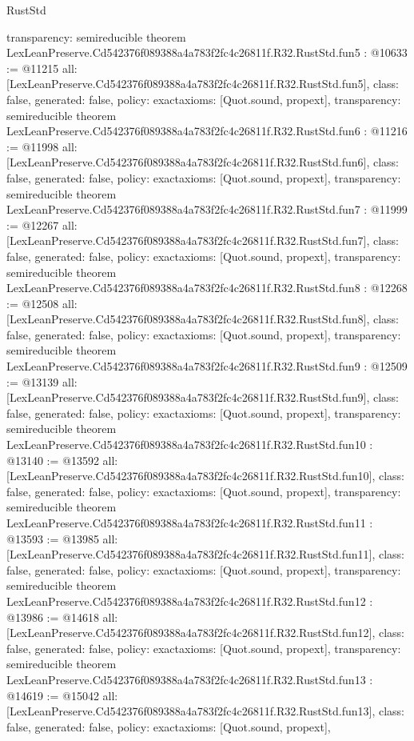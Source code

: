 \begin{lexlean}{RustStd}
\begin{coremodule}
{  transparency: semireducible
}
theorem LexLeanPreserve.Cd542376f089388a4a783f2fc4c26811f.R32.RustStd.fun5 : @10633 := @11215 {
  all: [LexLeanPreserve.Cd542376f089388a4a783f2fc4c26811f.R32.RustStd.fun5],
  class: false,
  generated: false,
  policy: exact{axioms: [Quot.sound, propext]},
  transparency: semireducible
}
theorem LexLeanPreserve.Cd542376f089388a4a783f2fc4c26811f.R32.RustStd.fun6 : @11216 := @11998 {
  all: [LexLeanPreserve.Cd542376f089388a4a783f2fc4c26811f.R32.RustStd.fun6],
  class: false,
  generated: false,
  policy: exact{axioms: [Quot.sound, propext]},
  transparency: semireducible
}
theorem LexLeanPreserve.Cd542376f089388a4a783f2fc4c26811f.R32.RustStd.fun7 : @11999 := @12267 {
  all: [LexLeanPreserve.Cd542376f089388a4a783f2fc4c26811f.R32.RustStd.fun7],
  class: false,
  generated: false,
  policy: exact{axioms: [Quot.sound, propext]},
  transparency: semireducible
}
theorem LexLeanPreserve.Cd542376f089388a4a783f2fc4c26811f.R32.RustStd.fun8 : @12268 := @12508 {
  all: [LexLeanPreserve.Cd542376f089388a4a783f2fc4c26811f.R32.RustStd.fun8],
  class: false,
  generated: false,
  policy: exact{axioms: [Quot.sound, propext]},
  transparency: semireducible
}
theorem LexLeanPreserve.Cd542376f089388a4a783f2fc4c26811f.R32.RustStd.fun9 : @12509 := @13139 {
  all: [LexLeanPreserve.Cd542376f089388a4a783f2fc4c26811f.R32.RustStd.fun9],
  class: false,
  generated: false,
  policy: exact{axioms: [Quot.sound, propext]},
  transparency: semireducible
}
theorem LexLeanPreserve.Cd542376f089388a4a783f2fc4c26811f.R32.RustStd.fun10 : @13140 := @13592 {
  all: [LexLeanPreserve.Cd542376f089388a4a783f2fc4c26811f.R32.RustStd.fun10],
  class: false,
  generated: false,
  policy: exact{axioms: [Quot.sound, propext]},
  transparency: semireducible
}
theorem LexLeanPreserve.Cd542376f089388a4a783f2fc4c26811f.R32.RustStd.fun11 : @13593 := @13985 {
  all: [LexLeanPreserve.Cd542376f089388a4a783f2fc4c26811f.R32.RustStd.fun11],
  class: false,
  generated: false,
  policy: exact{axioms: [Quot.sound, propext]},
  transparency: semireducible
}
theorem LexLeanPreserve.Cd542376f089388a4a783f2fc4c26811f.R32.RustStd.fun12 : @13986 := @14618 {
  all: [LexLeanPreserve.Cd542376f089388a4a783f2fc4c26811f.R32.RustStd.fun12],
  class: false,
  generated: false,
  policy: exact{axioms: [Quot.sound, propext]},
  transparency: semireducible
}
theorem LexLeanPreserve.Cd542376f089388a4a783f2fc4c26811f.R32.RustStd.fun13 : @14619 := @15042 {
  all: [LexLeanPreserve.Cd542376f089388a4a783f2fc4c26811f.R32.RustStd.fun13],
  class: false,
  generated: false,
  policy: exact{axioms: [Quot.sound, propext]},
}
\end{coremodule}
\end{lexlean}

